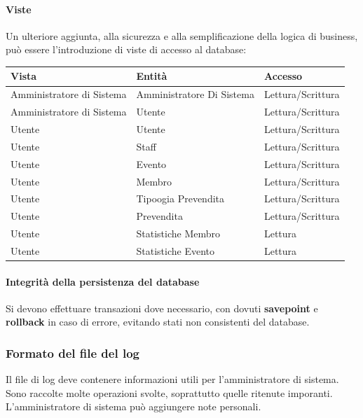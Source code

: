 \documentclass[a4paper]{article}
\begin{document}
\paragraph{Viste} Un ulteriore aggiunta, alla sicurezza e alla semplificazione della logica di business, può essere l'introduzione di viste di accesso al database:

\begin{center}
    \begin{tabularx}{1\textwidth}{|X|X|X|}
        \hline
        \textbf{Vista} & \textbf{Entità} & \textbf{Accesso}\\
        \hline
        \hline
        Amministratore di Sistema & Amministratore Di Sistema & Lettura/Scrittura\\
        Amministratore di Sistema & Utente & Lettura/Scrittura\\
        Utente & Utente & Lettura/Scrittura\\
        Utente & Staff & Lettura/Scrittura\\
        Utente & Evento & Lettura/Scrittura\\
        Utente & Membro & Lettura/Scrittura\\
        Utente & Tipoogia Prevendita & Lettura/Scrittura\\
        Utente & Prevendita & Lettura/Scrittura\\
        Utente & Statistiche Membro & Lettura\\
        Utente & Statistiche Evento & Lettura\\
        \hline
    \end{tabularx}
\end{center}

\paragraph{Integrità della persistenza del database} Si devono effettuare transazioni dove necessario, con dovuti \textbf{savepoint} e \textbf{rollback} in caso di errore, evitando stati non consistenti del database.

\subsubsection{Formato del file del log}

Il file di log deve contenere informazioni utili per l'amministratore di sistema. Sono raccolte molte operazioni svolte, soprattutto quelle ritenute imporanti. L'amministratore di sistema può aggiungere note personali.
\end{document}
